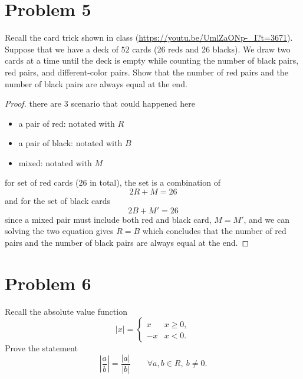 \vspace{1em}
\hrulefill


\section*{Problem 5}
Recall the card trick shown in class (\url{https://youtu.be/UmlZaONp-_I?t=3671}).
Suppose that we have a deck of $52$ cards (26 reds and 26 blacks). We draw two cards at a time until the deck is empty while counting the number of black pairs, red pairs, and different-color pairs. Show that the number of red pairs and the number of black pairs are always equal at the end.

\medskip
\solution

 \begin{proof}
  there are 3 scenario that could happened here
  \begin{itemize}
      \item a pair of red: notated with $R$
      \item a pair of black: notated with $B$
      \item mixed: notated with $M$
  \end{itemize}
  for set of red cards (26 in total), the set is a combination of
  \[
  2R + M = 26
  \]
  and for the set of black cards
  \[
  2B + M' = 26
  \]
  since a mixed pair must include both red and black card, $M = M'$,
  and we can solving the two equation gives $R = B$ which concludes
  that the number of red pairs and the number of black pairs are always
  equal at the end.
  \end{proof}

\vspace{1em}
\hrulefill


\section*{Problem 6}
Recall the absolute value function
\[
|x| = \begin{cases}
x & x \ge 0,\\
-x & x < 0.
\end{cases}
\]
Prove the statement
\[
\left|\frac{a}{b}\right| = \frac{|a|}{|b|}\qquad \forall a,b \in R,\ b \ne 0.
\]

\medskip
\solution

